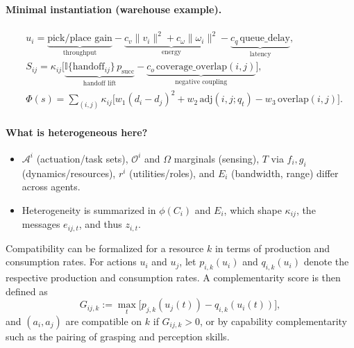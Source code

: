 \paragraph{Minimal instantiation (warehouse example).}
\vspace{-0.2em}
\begin{align*}
&u_i = \underbrace{\text{pick/place gain}}_{\text{throughput}}
-\underbrace{c_v\|v_i\|^2 + c_\omega\|\omega_i\|^2}_{\text{energy}}
-\underbrace{c_q\,\text{queue\_delay}}_{\text{latency}},\\
&S_{ij} = \kappa_{ij}\Big[\underbrace{\mathbb{I}\{\text{handoff}_{ij}\}\,p_{\text{succ}}}_{\text{handoff lift}}
-\underbrace{c_o\,\text{coverage\_overlap}(i,j)}_{\text{negative coupling}}\Big],\\
&\Phi(s)=\sum_{(i,j)}\kappa_{ij}\big[w_1(d_i-d_j)^2+w_2\,\text{adj}(i,j;q_t)-w_3\,\text{overlap}(i,j)\big].
\end{align*}

\paragraph{What is heterogeneous here?}
\begin{itemize}[leftmargin=1.1em]
\item $\mathcal{A}^i$ (actuation/task sets), $\mathcal{O}^i$ and $\Omega$ marginals (sensing), $T$ via $f_i,g_i$ (dynamics/resources),
$r^i$ (utilities/roles), and $E_i$ (bandwidth, range) differ across agents.
\item Heterogeneity is summarized in $\phi(C_i)$ and $E_i$, which shape $\kappa_{ij}$, the messages $e_{ij,t}$, and thus $z_{i,t}$.
\end{itemize}


Compatibility can be formalized for a resource $k$ in terms of production and consumption rates. For actions $u_i$ and $u_j$, let $p_{i,k}(u_i)$ and $q_{i,k}(u_i)$ denote the respective production and consumption rates. A complementarity score is then defined as
\[
G_{ij,k}:=\max_{t}\big[p_{j,k}(u_j(t)) - q_{i,k}(u_i(t))\big],
\]
and $(a_i,a_j)$ are compatible on $k$ if $G_{ij,k}>0$, or by capability complementarity such as the pairing of grasping and perception skills.

